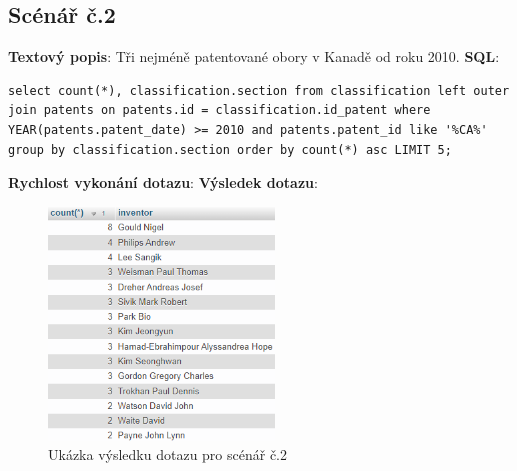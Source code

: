 \subsection{Scénář č.2}
\textbf{Textový popis}: Tři nejméně patentované obory v Kanadě od roku 2010.
\newline
\textbf{SQL}: 
\begin{lstlisting}[label = {lst:elements_a}]
select count(*), classification.section from classification left outer join patents on patents.id = classification.id_patent where YEAR(patents.patent_date) >= 2010 and patents.patent_id like '%CA%' group by classification.section order by count(*) asc LIMIT 5;
\end{lstlisting}
\textbf{Rychlost vykonání dotazu}: 
\newline
\textbf{Výsledek dotazu}:
\begin{figure}[H]
\centering
\includegraphics[width=6cm]{img/scenare/scenar_9}
\caption{Ukázka výsledku dotazu pro scénář č.2}
\label{fig:scenar2}
\end{figure}

